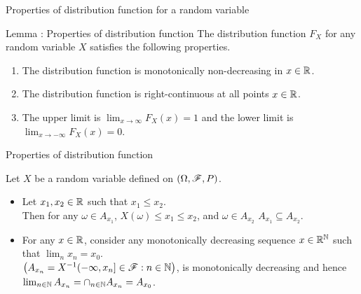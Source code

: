 \documentclass[12pt,aspectratio=169]{beamer}
\begin{document}
\begin{frame}{Properties of distribution function for a random variable}
\begin{block}{Lemma : Properties of distribution function} 
The distribution function $F_X$ for any random variable $X$ satisfies the following properties. 
\begin{enumerate}
\item <1-> The distribution function is monotonically non-decreasing in $x \in \mathbb{R}$. 
\item <2-> The distribution function is right-continuous at all points $x \in \mathbb{R}$.
\item <3-> The upper limit is $\lim_{x \to \infty}F_X(x) = 1$ and the lower limit is $\lim_{x \to -\infty}F_X(x) = 0$. 
\end{enumerate}
\end{block}
\end{frame}
\begin{frame}{Properties of distribution function}
\begin{Proof}
Let $X$ be a random variable defined on $(\Omega, \mathscr{F}, P)$. 
\begin{itemize}
\item <1-> Let $x_1, x_2 \in \mathbb{R}$ such that $x_1 \le x_2$.\\  
Then for any $\omega \in A_{x_1}$, $X(\omega) \le x_1 \le x_2$, and $\omega \in A_{x_2}$ \implies $A_{x_1} \subseteq A_{x_2}$. 
 
\item <2-> For any $x \in \mathbb{R}$, consider any monotonically decreasing sequence $x\in\mathbb{R}^{\mathbb{N}}$ such that $\lim_n x_n = x_0$.\\
$\big(A_{x_n} = X^{-1}(-\infty, x_n] \in \mathscr{F}: n \in \mathbb{N}\big)$, is monotonically decreasing and hence $\lim_{n \in \mathbb{N}}A_{x_n} = \cap_{n \in \mathbb{N}}A_{x_n} = A_{x_0}$.  
\end{itemize}
\end{Proof}
\end{frame}
\end{document}
